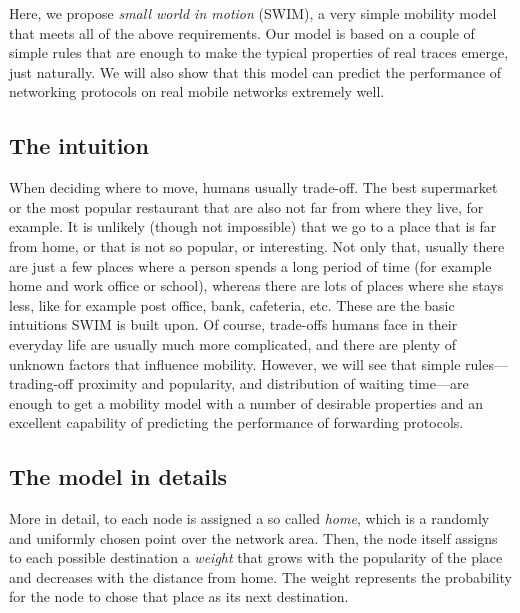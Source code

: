 \documentclass[conference]{IEEEtran}
\begin{document}
Here, we propose \emph{small world in motion} (SWIM), a very simple mobility
model that meets all of the above requirements. Our model is based on a couple
of simple rules that are enough to make the typical  properties of real traces
emerge, just naturally. We will also show that this model can predict the
performance of networking protocols on real mobile networks extremely well.

\subsection{The intuition}

When deciding where to move, humans usually trade-off. The best supermarket or the most popular restaurant that are also not far from where they live, for example. It is unlikely (though not impossible) that we go to a place that is far from home, or that is not so popular, or interesting. Not only that, usually there are just a few places where a person spends a long period of time (for example home and work office or school), whereas there are lots of places where she stays less, like for example post office, bank, cafeteria, etc. These are the basic intuitions SWIM is built upon. Of course, trade-offs humans face in their everyday life are usually much more complicated, and there are plenty of unknown factors that influence mobility. However, we will see that simple rules---trading-off proximity and popularity, and distribution of waiting time---are enough to get a mobility model with a number of desirable properties and an excellent capability of predicting the performance of forwarding protocols.

\subsection{The model in details}

More in detail, to each node is assigned a so called \emph{home}, which is a
randomly and uniformly chosen point over the network area. Then, the node itself
assigns to each possible destination a \emph{weight} that grows with the
popularity of the place and decreases with the distance from home. The weight
represents the probability for the node to chose that place as its next
destination.
\end{document}
